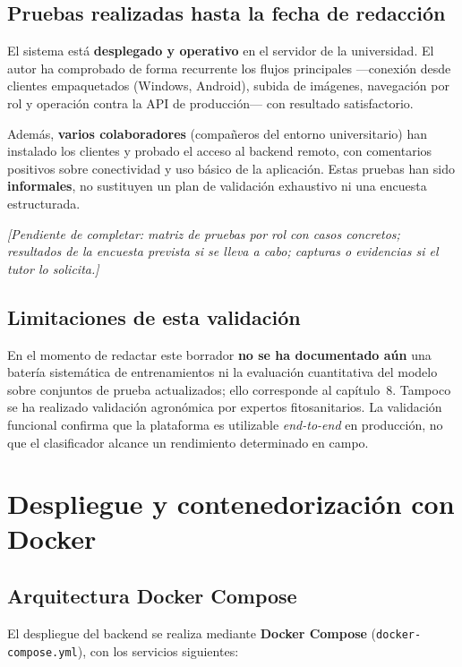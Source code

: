 \documentclass[11pt,spanish,listoffigures,listoftables]{tfgetsinf}
\begin{document}
\subsection{Pruebas realizadas hasta la fecha de redacción}

El sistema está \textbf{desplegado y operativo} en el servidor de la universidad. El autor ha comprobado de forma recurrente los flujos principales ---conexión desde clientes empaquetados (Windows, Android), subida de imágenes, navegación por rol y operación contra la API de producción--- con resultado satisfactorio.

Además, \textbf{varios colaboradores} (compañeros del entorno universitario) han instalado los clientes y probado el acceso al backend remoto, con comentarios positivos sobre conectividad y uso básico de la aplicación. Estas pruebas han sido \textbf{informales}, no sustituyen un plan de validación exhaustivo ni una encuesta estructurada.

\textit{[Pendiente de completar: matriz de pruebas por rol con casos concretos; resultados de la encuesta prevista si se lleva a cabo; capturas o evidencias si el tutor lo solicita.]}

\subsection{Limitaciones de esta validación}

En el momento de redactar este borrador \textbf{no se ha documentado aún} una batería sistemática de entrenamientos ni la evaluación cuantitativa del modelo sobre conjuntos de prueba actualizados; ello corresponde al capítulo~8. Tampoco se ha realizado validación agronómica por expertos fitosanitarios. La validación funcional confirma que la plataforma es utilizable \textit{end-to-end} en producción, no que el clasificador alcance un rendimiento determinado en campo.

\section{Despliegue y contenedorización con Docker}

\subsection{Arquitectura Docker Compose}

El despliegue del backend se realiza mediante \textbf{Docker Compose} (\texttt{docker-compose.yml}), con los servicios siguientes:
\end{document}
